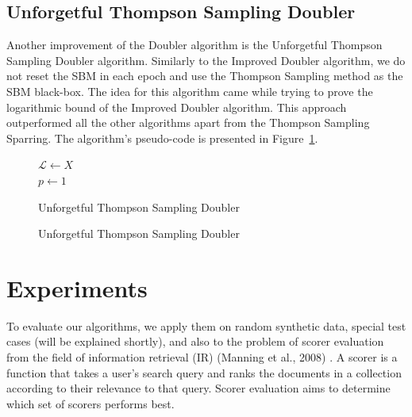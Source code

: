 \documentclass[MSc,beforeExam]{iitcsthesis}
\begin{document}
	\section{Unforgetful Thompson Sampling Doubler}
		Another improvement of the Doubler algorithm is the Unforgetful Thompson Sampling Doubler algorithm. Similarly to the Improved Doubler algorithm, we do not reset the SBM in each epoch and use the Thompson Sampling method as the SBM black-box.
		The idea for this algorithm came while trying to prove the logarithmic bound of the Improved Doubler algorithm.
		This approach outperformed all the other algorithms apart from the Thompson Sampling Sparring.
		The algorithm's pseudo-code is presented in Figure~\ref{algo_uts_doubler}.

		\begin{figure}[h]
	\IncMargin{1em}
		\begin{algorithm}[H]
		\BlankLine
		$\mathcal{L} \leftarrow X$\\
		$p\leftarrow 1$\\
			\caption{Unforgetful Thompson Sampling Doubler}
		\end{algorithm}
		\caption{Unforgetful Thompson Sampling Doubler}\label{algo_uts_doubler}
	\end{figure}

\chapter{Experiments}

To evaluate our algorithms, we apply them on random synthetic data, special test cases (will be explained shortly), and also to the problem of scorer evaluation from the field of information retrieval (IR) (Manning et al., 2008) \cite{manning2008introduction}.  
A scorer is a function that takes a user's search query and ranks the documents in a collection according to their relevance to that query. Scorer evaluation aims to determine which set of scorers performs best.
\end{document}
